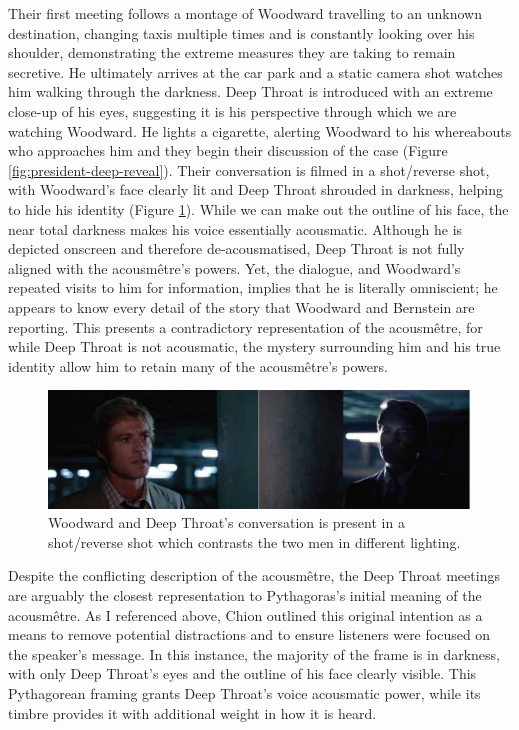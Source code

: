 Their first meeting follows a montage of Woodward travelling to an unknown destination, changing taxis multiple times and is constantly looking over his shoulder, demonstrating the extreme measures they are taking to remain secretive.
He ultimately arrives at the car park and a static camera shot watches him walking through the darkness.
Deep Throat is introduced with an extreme close-up of his eyes, suggesting it is his perspective through which we are watching Woodward.
He lights a cigarette, alerting Woodward to his whereabouts who approaches him and they begin their discussion of the case (Figure \ref{fig:president-deep-reveal}).
Their conversation is filmed in a shot/reverse shot, with Woodward's face clearly lit and Deep Throat shrouded in darkness, helping to hide his identity (Figure \ref{fig:president-deep-reverse}).
While we can make out the outline of his face, the near total darkness makes his voice essentially acousmatic.
Although he is depicted onscreen and therefore de-acousmatised, Deep Throat is not fully aligned with the acousmêtre's powers. 
Yet, the dialogue, and Woodward's repeated visits to him for information, implies that he is literally omniscient; he appears to know every detail of the story that Woodward and Bernstein are reporting.
This presents a contradictory representation of the acousmêtre, for while Deep Throat is not acousmatic, the mystery surrounding him and his true identity allow him to retain many of the acousmêtre's powers.

\begin{figure}
    \centering
    \includegraphics[width=1\linewidth]{img/president-deep-reverse.pdf}
    \caption{Woodward and Deep Throat's conversation is present in a shot/reverse shot which contrasts the two men in different lighting.}
    \label{fig:president-deep-reverse}
\end{figure}

Despite the conflicting description of the acousmêtre, the Deep Throat meetings are arguably the closest representation to Pythagoras's initial meaning of the acousmêtre.
As I referenced above, Chion outlined this original intention as a means to remove potential distractions and to ensure listeners were focused on the speaker's message.
In this instance, the majority of the frame is in darkness, with only Deep Throat's eyes and the outline of his face clearly visible.
This Pythagorean framing grants Deep Throat's voice acousmatic power, while its timbre provides it with additional weight in how it is heard.

